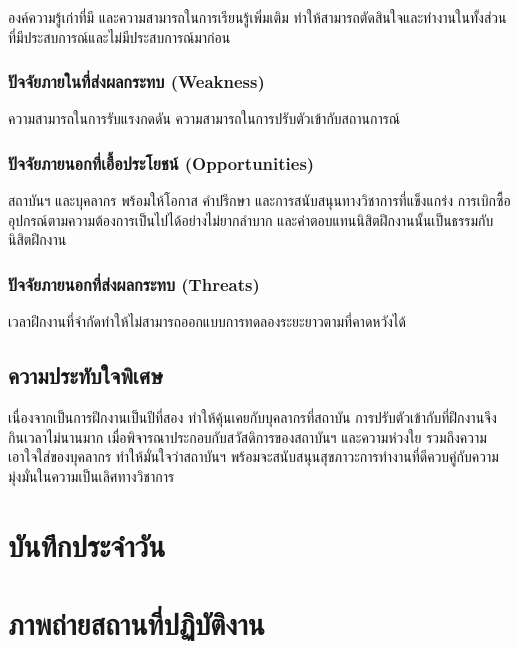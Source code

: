 \documentclass[16pt,a4]{internshipreport}
\begin{document}
องค์ความรู้เก่าที่มี และความสามารถในการเรียนรู้เพิ่มเติม ทำให้สามารถตัดสินใจและทำงานในทั้งส่วนที่มีประสบการณ์และไม่มีประสบการณ์มาก่อน

\subsection{ปัจจัยภายในที่ส่งผลกระทบ (Weakness)}

ความสามารถในการรับแรงกดดัน ความสามารถในการปรับตัวเข้ากับสถานการณ์

\subsection{ปัจจัยภายนอกที่เอื้อประโยชน์ (Opportunities)}

สถาบันฯ และบุคลากร พร้อมให้โอกาส คำปรึกษา และการสนับสนุนทางวิชาการที่แข็งแกร่ง การเบิกซื้ออุปกรณ์ตามความต้องการเป็นไปได้อย่างไม่ยากลำบาก และค่าตอบแทนนิสิตฝึกงานนั้นเป็นธรรมกับนิสิตฝึกงาน

\subsection{ปัจจัยภายนอกที่ส่งผลกระทบ (Threats)}

เวลาฝึกงานที่จำกัดทำให้ไม่สามารถออกแบบการทดลองระยะยาวตามที่คาดหวังได้
\section{ความประทับใจพิเศษ}

เนื่องจากเป็นการฝึกงานเป็นปีที่สอง ทำให้คุ้นเคยกับบุคลากรที่สถาบัน การปรับตัวเข้ากับที่ฝึกงานจึงกินเวลาไม่นานมาก เมื่อพิจารณาประกอบกับสวัสดิการของสถาบันฯ และความห่วงใย รวมถึงความเอาใจใส่ของบุคลากร ทำให้มั่นใจว่าสถาบันฯ พร้อมจะสนับสนุนสุขภาวะการทำงานที่ดีควบคู่กับความมุ่งมั่นในความเป็นเลิศทางวิชาการ





\begin{appendices}
\renewcommand{\thechapter}{\thaiAlph{chapter}}
    
\chapter{บันทึกประจำวัน}


\chapter{ภาพถ่ายสถานที่ปฏิบัติงาน}

\end{appendices}
\end{document}
